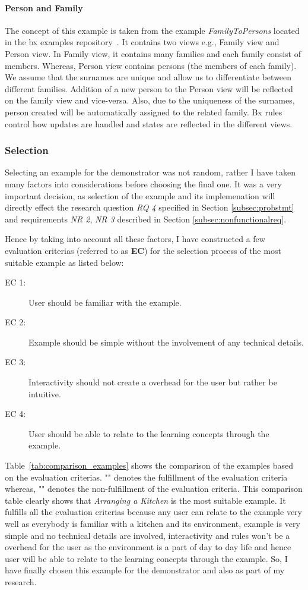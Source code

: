 \paragraph{Person and Family}
The concept of this example is taken from the example \emph{FamilyToPersons} located in the bx examples repository~\cite{bx-examples}. It contains two views e.g., Family view and Person view. In Family view, it contains many families and each family consist of members. Whereas, Person view contains persons (the members of each family). We assume that the surnames are unique and allow us to differentiate between different families. Addition of a new person to the Person view will be reflected on the family view and vice-versa. Also, due to the uniqueness of the surnames, person created will be automatically assigned to the related family. Bx rules control how updates are handled and states are reflected in the different views.

\subsubsection{Selection}\label{subsubsec:exampleselection}
Selecting an example for the demonstrator was not random, rather I have taken many factors into considerations before choosing the final one. It was a very important decision, as selection of the example and its implemenation will directly effect the research question \textit{RQ 4} specified in Section \ref{subsec:probstmt} and requirements \textit{NR 2}, \textit{NR 3} described in Section \ref{subsec:nonfunctionalreq}.

Hence by taking into account all these factors, I have constructed a few evaluation criterias (referred to as \textbf{EC}) for the selection process of the most suitable example as listed below:
\begin{description}
	\item [EC 1:] User should be familiar with the example.
	\item [EC 2:] Example should be simple without the involvement of any technical details.
	\item [EC 3:] Interactivity should not create a overhead for the user but rather be intuitive.
	\item [EC 4:] User should be able to relate to the learning concepts through the example.
\end{description}

Table~\ref{tab:comparison_examples} shows the comparison of the examples based on the evaluation criterias. "\checkmark" denotes the fulfillment of the evaluation criteria whereas, "" denotes the non-fulfillment of the evaluation criteria. This comparison table clearly shows that \textit{Arranging a Kitchen} is the most suitable example. It fulfills all the evaluation criterias because any user can relate to the example very well as everybody is familiar with a kitchen and its environment, example is very simple and no technical details are involved, interactivity and rules won't be a overhead for the user as the environment is a part of day to day life and hence user will be able to relate to the learning concepts through the example. So, I have finally chosen this example for the demonstrator and also as part of my research.

